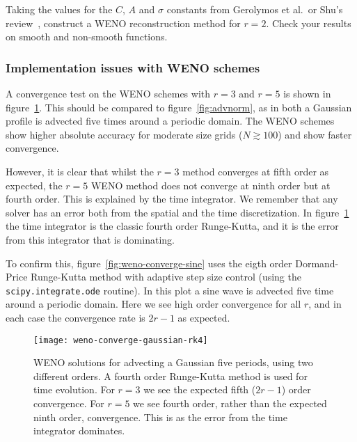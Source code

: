 \begin{exercise}
{Taking the values for the $C$, $A$ and $\sigma$ constants from Gerolymos et
al.\ or Shu's review~\cite{Shu1997}, construct a WENO reconstruction method for
$r=2$. Check your results on smooth and non-smooth functions.}
\end{exercise}

\subsubsection{Implementation issues with WENO schemes}
\label{sec:weno-implementation}

A convergence test on the WENO schemes with $r=3$ and $r=5$ is shown in
figure~\ref{fig:weno-converge-gaussian-rk4}. This should be compared to
figure~\ref{fig:advnorm}, as in both a Gaussian profile is advected five
times around a periodic domain. The WENO schemes show higher absolute accuracy
for moderate size grids ($N \gtrsim 100$) and show faster convergence.

However, it is clear that whilst the $r=3$ method converges at fifth order as
expected, the $r=5$ WENO method does not converge at ninth order but at fourth
order. This is explained by the time integrator. We remember that any solver
has an error both from the spatial and the time discretization. In
figure~\ref{fig:weno-converge-gaussian-rk4} the time integrator is the classic
fourth order Runge-Kutta, and it is the error from this integrator that is
dominating.

To confirm this, figure~\ref{fig:weno-converge-sine} uses the eigth order
Dormand-Price Runge-Kutta method with adaptive step size control (using the
\texttt{scipy.integrate.ode} routine). In this plot a sine wave is advected five
time around a periodic domain. Here we see high order convergence for
all $r$, and in each case the convergence rate is $2 r - 1$ as expected.

\begin{figure}[t]
\centering
\texttt{[image: weno-converge-gaussian-rk4]}
\caption[High order WENO convergence rates for linear advection]
{\label{fig:weno-converge-gaussian-rk4} WENO solutions for advecting a Gaussian five periods, using two different orders. A fourth order Runge-Kutta method is used for time evolution. For $r=3$ we see the expected fifth ($2 r - 1$) order convergence. For $r=5$ we see fourth order, rather than the expected ninth order, convergence. This is as the error from the time integrator dominates. \\
}
\end{figure}
%

